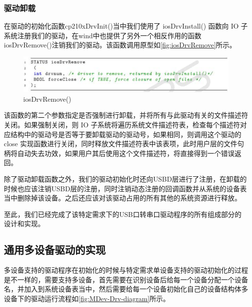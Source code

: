 \subsubsection{驱动卸载}
	在驱动的初始化函数cp210xDrvInit()当中我们使用了 iosDrvInstall() 函数向 IO 子系统注册我们的驱动，在wind中也提供了另外一个相反作用的函数iosDrvRemove()注销我们的驱动。该函数调用原型如\autoref{fig:iosDrvRemove}所示。
	
\begin{figure}[!h]
\centering
\includegraphics[width=1.0\textwidth]{./graphics/iosDrvRemove.pdf}
\caption{iosDrvRemove()}\label{fig:iosDrvRemove}
\end{figure}

该函数的第二个参数指定是否强制进行卸载，并将所有与此驱动有关的文件描述符关闭。如果强制关闭，则 IO 子系统将遍历系统文件描述符表，检查每个描述符对应结构中的驱动号是否等于要卸载驱动的驱动号，如果相同，则调用这个驱动的 close 实现函数进行关闭，同时释放文件描述符表中该表项，此时用户层的文件句柄将自动失去功效，如果用户其后使用这个文件描述符，将直接得到一个错误返回。

除了驱动卸载函数之外，我们的驱动初始化时还向USBD层进行了注册，在卸载的时候也应该注销USBD层的注册，同时注销动态注册的回调函数并从系统的设备表当中删除掉该设备。之后还应该对该驱动占用的所有其他的系统资源进行释放。

至此，我们已经完成了该特定需求下的USB口转串口驱动程序的所有组成部分的设计和实现。

\subsection{通用多设备驱动的实现}
多设备支持的驱动程序在初始化的时候与特定需求单设备支持的驱动初始化的过程是不一样的，需要支持多设备，首先需要在识别设备后给每一个设备分配一个设备名，并加入到系统设备表当中，然后需要给每一个设备初始化自己的设备结构体多设备下的驱动运行流程如\autoref{fig:MDev-Drv-diagram}所示。

